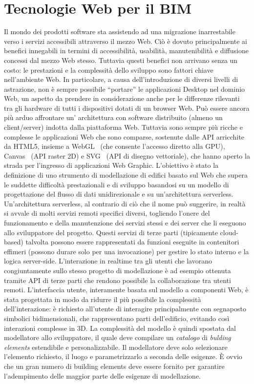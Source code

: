 \section{Tecnologie Web per il BIM}
\label{sec:chapter_1_section_3}

Il mondo dei prodotti software sta assistendo ad una migrazione inarrestabile verso i servizi accessibili
attraverso il mezzo Web. Ciò è dovuto principalmente ai benefici innegabili in termini di accessibilità, usabilità,
manutenibilità e diffusione concessi dal mezzo Web stesso.
Tuttavia questi benefici non arrivano senza un costo: le prestazioni e la complessità dello sviluppo sono fattori chiave nell'ambiente Web.
In particolare, a causa dell'introduzione di diversi livelli di astrazione, non è sempre possibile ``portare'' le
applicazioni Desktop nel dominio Web, un aspetto da prendere in considerazione anche per le differenze rilevanti
tra gli hardware di tutti i dispositivi dotati di un browser Web.
Può essere ancora più arduo affrontare un' architettura con software distribuito (almeno un client/server)
indotta dalla piattaforma Web. Tuttavia sono sempre più ricche e complesse le applicazioni Web che sono comparse,
sostenute dalle API arricchite da HTML5, insieme a WebGL~\cite{webgl}
(che consente l'accesso diretto alla GPU), Canvas~\cite{Munro:15:HCC} (API raster 2D) e SVG~\cite{Jackson:11:SVG}
(API di disegno vettoriale), che hanno aperto la strada per l'ingresso di applicazioni Web Graphic.
L'obiettivo è stato la definizione di uno strumento di modellazione di edifici basato sul Web
che supera le suddette difficoltà prestazionali e di sviluppo basandosi su un modello di progettazione del flusso di dati
unidirezionale e su un'architettura serverless.
Un'architettura serverless, al contrario di ciò che il nome può suggerire, in realtà si avvale di molti servizi remoti specifici
diversi, togliendo l'onere del funzionamento e della manutenzione dei servizi stessi e dei server che li eseguono
allo sviluppatore del progetto.
Questi servizi di terze parti (tipicamente cloud-based) talvolta possono essere rappresentati da funzioni eseguite
in contenitori effimeri (possono durare solo per una invocazione) per gestire lo stato interno e la logica server-side.
L'interazione in realtime tra gli utenti che lavorano congiuntamente sullo stesso progetto di modellazione
è ad esempio ottenuta tramite API di terze parti che rendono possibile la collaborazione tra utenti remoti.
L'interfaccia utente, interamente basata sul modello a componenti Web, è stata progettata in modo da ridurre il più possibile la complessità
dell'interazione:
è richiesto all'utente di interagire principalmente con segnaposto simbolici bidimensionali, che rappresentano parti dell'edificio,
evitando così interazioni complesse in 3D.
La complessità del modello è quindi spostata dal modellatore allo sviluppatore, il quale deve compilare un \emph{catalogo} di
\emph{bulding elements} estendibile e personalizzabile. Il modellatore deve solo selezionare l'elemento richiesto,
il luogo e parametrizzarlo a seconda delle esigenze. È ovvio che un gran numero di building elements deve essere fornito
per garantire l'adempimento delle maggior parte delle esigenze di modellazione.\\
